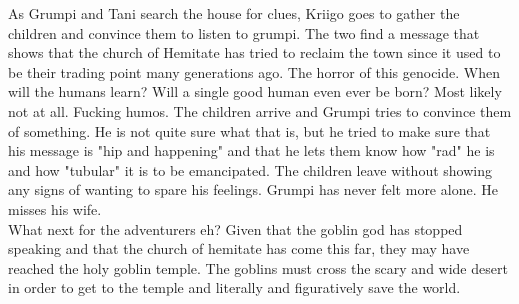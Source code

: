 As Grumpi and Tani search the house for clues, Kriigo goes to gather the children and convince them to listen to grumpi. The two find a message that shows that the church of Hemitate has tried to reclaim the town since it used to be their trading point many generations ago. The horror of this genocide. When will the humans learn? Will a single good human even ever be born? Most likely not at all. Fucking humos. The children arrive and Grumpi tries to convince them of something. He is not quite sure what that is, but he tried to make sure that his message is "hip and happening" and that he lets them know how "rad" he is and how "tubular" it is to be emancipated. The children leave without showing any signs of wanting to spare his feelings. Grumpi has never felt more alone. He misses his wife.\\

What next for the adventurers eh? Given that the goblin god has stopped speaking and that the church of hemitate has come this far, they may have reached the holy goblin temple. The goblins must cross the scary and wide desert in order to get to the temple and literally and figuratively save the world.